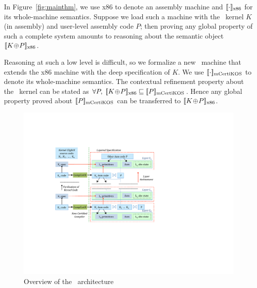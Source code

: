 In Figure~\ref{fig:mainthm}\ronghui{$\oplus$}, we use x86 to denote an assembly machine
and {$\sem{\rm{}x86}{\cdot}$} for its whole-machine semantics.
Suppose we load such a machine with the \mCTOS\ kernel $K$ (in
assembly) and user-level assembly code $P$; then proving any
global property of such a complete system amounts to reasoning about
the semantic object {$\sem{\rm{}x86}{K\join P}$}.

Reasoning at such a low level is difficult, so we formalize a new
\mCTOS\ machine that extends the x86 machine with the deep
specification of $K$. We use $\sem{\rm\mCTOS}{\cdot}$ to denote its
whole-machine semantics.  The contextual refinement property about the
\mCTOS\ kernel can be stated as $\forall
P,\;\sem{\rm{}x86}{K\join{}P}\Refrel{}\sem{\rm\mCTOS}{P}$.
\noindent{}Hence any global property proved about
$\sem{\rm\mCTOS}{P}$ can be transferred to
$\sem{\rm{}x86}{K\join{}P}$.



\begin{figure}[tb] \centering
\includegraphics[scale=1]{figs/archA}
\caption{Overview of the \CTOS\ architecture}
\label{fig:arch}
\end{figure}

